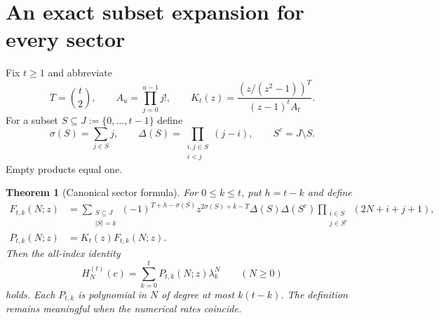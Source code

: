 \documentclass[11pt,a4paper]{article}
\numberwithin{equation}{section}
\newtheorem{theorem}{Theorem}[section]
\theoremstyle{definition}
\theoremstyle{remark}
\newcommand{\cH}[2]{H_{#1}^{(#2)}}
\begin{document}
\section{An exact subset expansion for every sector}\label{cyc:sec:sectors}

Fix $t\ge1$ and abbreviate
\begin{equation}\label{cyc:eq:TK}
 T=\binom t2,\qquad A_u=\prod_{j=0}^{u-1}j!,\qquad
 K_t(z)=\frac{(z/(z^2-1))^T}{(z-1)^tA_t}.
\end{equation}
For a subset $S\subseteq J:=\{0,\ldots,t-1\}$ define
\begin{equation}\label{cyc:eq:subsetnotation}
 \sigma(S)=\sum_{j\in S}j,\qquad
 \Delta(S)=\prod_{\substack{i,j\in S\\i<j}}(j-i),\qquad S^c=J\setminus S.
\end{equation}
Empty products equal one.

\begin{theorem}[Canonical sector formula]\label{cyc:thm:subset}
For $0\le k\le t$, put $h=t-k$ and define
\begin{align}
 F_{t,k}(N;z)
 &=\sum_{\substack{S\subseteq J\\|S|=k}}
 (-1)^{T+h-\sigma(S)}z^{2\sigma(S)+k-T}\Delta(S)\Delta(S^c)
 \prod_{\substack{i\in S\\j\in S^c}}(2N+i+j+1),
 \label{cyc:eq:rawsector}\\
 P_{t,k}(N;z)&=K_t(z)F_{t,k}(N;z).
 \label{cyc:eq:Psector}
\end{align}
Then the all-index identity
\begin{equation}\label{cyc:eq:sectorH}
 \cH Nt(c)=\sum_{k=0}^{t}P_{t,k}(N;z)\lambda_k^N\qquad(N\ge0)
\end{equation}
holds.  Each $P_{t,k}$ is polynomial in $N$ of degree at most $k(t-k)$.
The definition remains meaningful when the numerical rates coincide.
\end{theorem}
\end{document}
